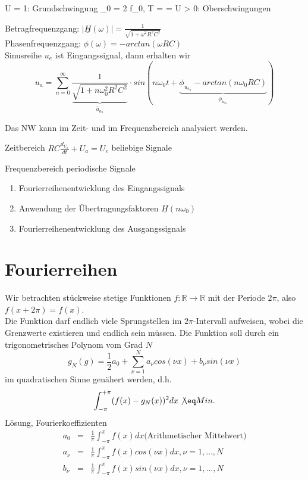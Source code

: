 \documentclass[german]{article}
\begin{document}
U = 1: Grundschwingung
	\omega_0 = 2 \pi f_0, T =  = 
U > 0: Oberschwingungen

Betragfrequenzgang: $|\underline{H}(\omega)| = \frac1{\sqrt{1 + \omega^2 R^2 C^2}}$ \\
Phasenfrequenzgang: $\phi(\omega) = - arctan(\omega R C)$ \\
Sinusreihe $u_e$ ist Eingangssignal, dann erhalten wir
\[ u_a = \sum_{n=0}^\infty \frac1{\underbrace{\sqrt{1 + n\omega_0^2 R^2 C^2}}_{\hat{u}_a_n}} \cdot sin(n \omega_0 t + \underbrace{\phi_u_e_n - arctan(n \omega_0 R C)}_{\phi_u_a_n}) \]

Das NW kann im Zeit- und im Frequenzbereich analysiert werden.

Zeitbereich
$RC \frac{d_U_a}{dt} + U_a = U_e$
beliebige Signale

Frequenzbereich
periodische Signale
\begin{enumerate}
	\item Fourierreihenentwicklung des Eingangssignals
	\item Anwendung der Übertragungsfaktoren $\underline{H}(n\omega_0)$
	\item Fourierreihenentwicklung des Ausgangssignals
\end{enumerate}


\section{Fourierreihen}
Wir betrachten stückweise stetige Funktionen $f: \mathbb{R} \rightarrow \mathbb{R}$ mit der Periode $2\pi$, also $f(x+2\pi) = f(x)$. \\
Die Funktion darf endlich viele Sprungstellen im $2\pi$-Intervall aufweisen, wobei die Grenzwerte existieren und endlich sein müssen. Die Funktion soll durch ein trigonometrisches Polynom vom Grad $N$
\[ g_N(g) = \frac12 a_0 + \sum_{\nu = 1}^N a_\nu cos(\nu x) + b_\nu sin(\nu x)\]
im quadratischen Sinne genähert werden, d.h.
\[ \int_{-\pi}^{+\pi} (f(x) - g_N(x))^2 dx \not\eq Min. \]
Lösung, Fourierkoeffizienten
\begin{eqnarray*}
	a_0 & = & \frac1{\pi} \int_{-\pi}^{\pi} f(x) dx \text{(Arithmetischer Mittelwert)} \\
	a_\nu & = & \frac1{\pi} \int_{-\pi}^{\pi} f(x) cos(\nu x) dx, \nu = 1, \ldots, N \\
	b_\nu & = & \frac1{\pi} \int_{-\pi}^{\pi} f(x) sin(\nu x) dx, \nu = 1, \ldots, N \\
\end{eqnarray*}
\end{document}
